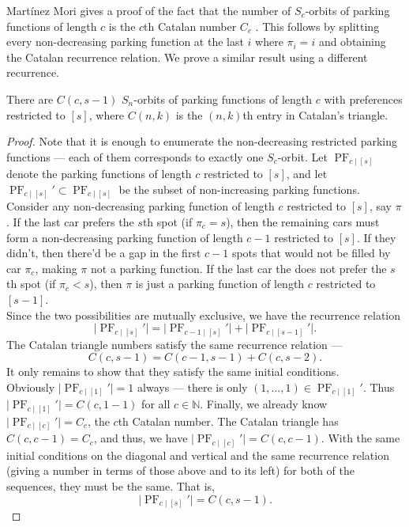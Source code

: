 Martínez Mori gives a proof of the fact that the number of $S_{c}$-orbits of parking functions of length $c$ is the $c$th Catalan number $C_{c}$ \cite{martinezmori-2024}. This follows by splitting every non-decreasing parking function at the last $i$ where $\pi_{i} = i$ and obtaining the Catalan recurrence relation. We prove a similar result using a different recurrence.

\begin{proposition}
	There are $C(c, s - 1)$ $S_{n}$-orbits of parking functions of length $c$ with preferences restricted to $[s]$, where $C(n, k)$ is the $(n, k)$th entry in Catalan's triangle.
\end{proposition}

\begin{proof}
	Note that it is enough to enumerate the non-decreasing restricted parking functions --- each of them corresponds to exactly one $S_{c}$-orbit. Let $\operatorname{PF}_{c \mid [s]}$ denote the parking functions of length $c$ restricted to $[s]$, and let $\operatorname{PF}_{c \mid [s]}' \subset \operatorname{PF}_{c \mid [s]}$ be the subset of non-increasing parking functions. \\

	Consider any non-decreasing parking function of length $c$ restricted to $[s]$, say $\pi$. If the last car prefers the $s$th spot (if $\pi_{c} = s$), then the remaining cars must form a non-decreasing parking function of length $c - 1$ restricted to $[s]$. If they didn't, then there'd be a gap in the first $c - 1$ spots that would not be filled by car $\pi_{c}$, making $\pi$ not a parking function. If the last car the does not prefer the $s$th spot (if $\pi_{c} < s$), then $\pi$ is just a parking function of length $c$ restricted to $[s - 1]$. \\

	Since the two possibilities are mutually exclusive, we have the recurrence relation
	\[
		\lvert \operatorname{PF}_{c \mid [s]}' \rvert = \lvert \operatorname{PF}_{c - 1 \mid [s]}' \rvert + \lvert \operatorname{PF}_{c \mid [s - 1]}' \rvert.
	\]
	The Catalan triangle numbers satisfy the same recurrence relation ---
	\[
		C(c, s - 1) = C(c - 1, s - 1) + C(c, s - 2).
	\]
	It only remains to show that they satisfy the same initial conditions. \\

	Obviously $\lvert \operatorname{PF}_{c \mid [1]}' \rvert = 1$ always --- there is only $(1, \dots, 1) \in \operatorname{PF}_{c \mid [1]}'$. Thus $\lvert \operatorname{PF}_{c \mid [1]}' \rvert = C(c, 1 - 1)$ for all $c \in \mathbb{N}$. Finally, we already know $\lvert \operatorname{PF}_{c \mid [c]}' \rvert = C_{c}$, the $c$th Catalan number. The Catalan triangle has $C(c, c - 1) = C_{c}$, and thus, we have $\lvert \operatorname{PF}_{c \mid [c]}' \rvert = C(c, c - 1)$. With the same initial conditions on the diagonal and vertical and the same recurrence relation (giving a number in terms of those above and to its left) for both of the sequences, they must be the same. That is,
	\[
		\lvert \operatorname{PF}_{c \mid [s]}' \rvert = C(c, s - 1).
	\]
\end{proof}


